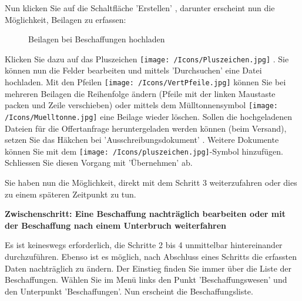 \vspace{\baselineskip}

Nun klicken Sie auf die Schaltfläche 'Erstellen' , darunter erscheint nun die Möglichkeit, Beilagen zu
erfassen:

\begin{figure}[H]
\caption{Beilagen bei Beschaffungen hochladen}
\end{figure}

Klicken Sie dazu auf das Pluszeichen \texttt{[image: /Icons/Pluszeichen.jpg]} . Sie können nun die Felder bearbeiten  und mittels 'Durchsuchen'  eine Datei hochladen. Mit den Pfeilen \texttt{[image: /Icons/VertPfeile.jpg]}  können Sie bei mehreren Beilagen die Reihenfolge ändern (Pfeile mit der linken Maustaste packen und Zeile verschieben) oder mittels dem Mülltonnensymbol \texttt{[image: /Icons/Muelltonne.jpg]}  eine Beilage wieder löschen.
Sollen die hochgeladenen Dateien für die Offertanfrage heruntergeladen werden können (beim Versand), setzen Sie das Häkchen bei 'Ausschreibungsdokument' . Weitere Dokumente können Sie mit dem \texttt{[image: /Icons/pluszeichen.jpg]}-Symbol  hinzufügen. Schliessen Sie diesen Vorgang mit 'Übernehmen' ab.

\vspace{\baselineskip}

Sie haben nun die Möglichkeit, direkt mit dem Schritt 3 weiterzufahren oder dies zu einem späteren Zeitpunkt zu tun.

\vspace{\baselineskip}

\textbf{Zwischenschritt: Eine Beschaffung nachträglich bearbeiten oder mit der Beschaffung nach einem
Unterbruch weiterfahren}

\vspace{\baselineskip}

Es ist keineswegs erforderlich, die Schritte 2 bis 4 unmittelbar hintereinander durchzuführen. Ebenso ist es möglich, nach Abschluss eines Schritts die erfassten Daten nachträglich zu ändern. Der Einstieg finden Sie immer über die Liste der Beschaffungen. Wählen Sie im Menü links den Punkt 'Beschaffungswesen' und den Unterpunkt 'Beschaffungen'. Nun erscheint die Beschaffungsliste.

